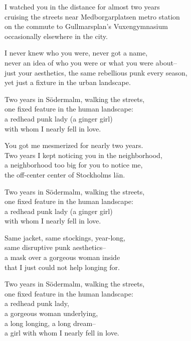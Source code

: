 \begin{lyrics}
I watched you in the distance for almost two years\\
cruising the streets near Medborgarplatsen metro station\\
on the commute to Gullmarsplan's Vuxengymnasium\\
occasionally elsewhere in the city.

I never knew who you were, never got a name,\\
never an idea of who you were or what you were about--\\
just your aesthetics, the same rebellious punk every season,\\
yet just a fixture in the urban landscape.

Two years in Södermalm, walking the streets,\\
one fixed feature in the human landscape:\\
a redhead punk lady (a ginger girl)\\
with whom I nearly fell in love.

You got me mesmerized for nearly two years.\\
Two years I kept noticing you in the neighborhood,\\
a neighborhood too big for you to notice me,\\
the off-center center of Stockholms län.

Two years in Södermalm, walking the streets,\\
one fixed feature in the human landscape:\\
a redhead punk lady (a ginger girl)\\
with whom I nearly fell in love.

Same jacket, same stockings, year-long,\\
same disruptive punk aesthetics--\\
a mask over a gorgeous woman inside\\
that I just could not help longing for.

Two years in Södermalm, walking the streets,\\
one fixed feature in the human landscape:\\
a redhead punk lady,\\
a gorgeous woman underlying,\\
a long longing, a long dream--\\
a girl with whom I nearly fell in love.
\end{lyrics}

